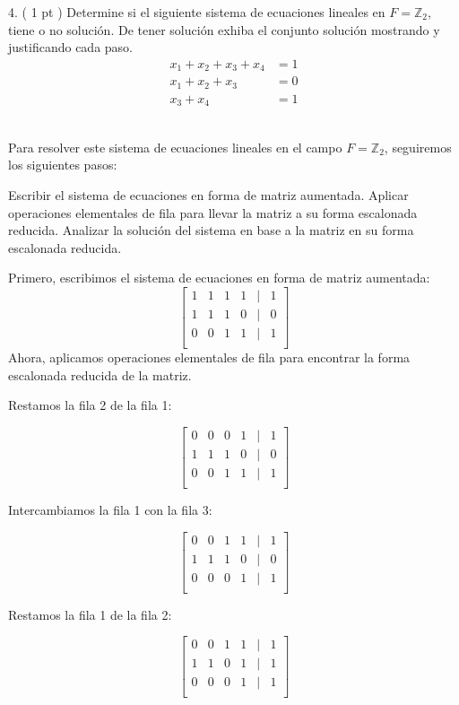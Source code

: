 4. ( 1 pt ) Determine si el siguiente sistema de ecuaciones lineales en \( F=\mathbb{Z}_{2} \), tiene o no solución. De tener solución exhiba el conjunto solución mostrando y justificando cada paso.
\[
\begin{aligned}
x_{1}+x_{2}+x_{3}+x_{4} & =1 \\
x_{1}+x_{2}+x_{3} & =0 \\
x_{3}+x_{4} & =1
\end{aligned}
\] \\

\begin{solution}
Para resolver este sistema de ecuaciones lineales en el campo \( F = \mathbb{Z}_2 \), seguiremos los siguientes pasos:

Escribir el sistema de ecuaciones en forma de matriz aumentada.
Aplicar operaciones elementales de fila para llevar la matriz a su forma escalonada reducida.
Analizar la solución del sistema en base a la matriz en su forma escalonada reducida.

Primero, escribimos el sistema de ecuaciones en forma de matriz aumentada:
\[
\begin{bmatrix}
1 & 1 & 1 & 1 & \vert & 1 \\
1 & 1 & 1 & 0 & \vert & 0 \\
0 & 0 & 1 & 1 & \vert & 1 \\
\end{bmatrix}
\]
Ahora, aplicamos operaciones elementales de fila para encontrar la forma escalonada reducida de la matriz.

Restamos la fila 2 de la fila 1:

\[
\begin{bmatrix}
0 & 0 & 0 & 1 & \vert & 1 \\
1 & 1 & 1 & 0 & \vert & 0 \\
0 & 0 & 1 & 1 & \vert & 1 \\
\end{bmatrix}
\]

Intercambiamos la fila 1 con la fila 3:

\[
\begin{bmatrix}
0 & 0 & 1 & 1 & \vert & 1 \\
1 & 1 & 1 & 0 & \vert & 0 \\
0 & 0 & 0 & 1 & \vert & 1 \\
\end{bmatrix}
\]

Restamos la fila 1 de la fila 2:

\[
\begin{bmatrix}
0 & 0 & 1 & 1 & \vert & 1 \\
1 & 1 & 0 & 1 & \vert & 1 \\
0 & 0 & 0 & 1 & \vert & 1 \\
\end{bmatrix}
\]


\end{solution}
